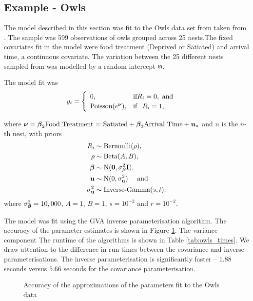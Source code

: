 \subsection{Example - Owls}
\label{sec:owls}

The model described in this section was fit to the Owls data set from taken
from \cite{zuur_mixed_2009}.  The sample was 599 observations of owls grouped
across 25 nests.The fixed covariates fit in the model were food treatment
(Deprived or Satiated) and arrival time, a continuous covariate.  The variation
between the 25 different nests sampled from was modelled by a random intercept
${\bf u}$.

The model fit was
$$
	y_i = \begin{cases}
	\begin{array}{ll}
	0, & \text{if} R_i = 0, \text{ and } \\
	\text{Poisson}(e^{\boldsymbol \nu}), & \text{if} \phantom{-} R_i = 1,
	\end{array}
	\end{cases}
$$

where ${\boldsymbol \nu} = {{\boldsymbol \beta}_2 \text{Food Treatment = Satiated} + {\boldsymbol \beta}_3
\text{Arrival Time} + {\bf u}_n}$ and $n$ is the $n$-th nest, with priors
\begin{align*}
R_i &\sim \text{Bernoulli}(\rho), \\
\rho &\sim \text{Beta}(A, B), \\
{\boldsymbol \beta} &\sim \text{N}({\bf 0}, \sigma_{\boldsymbol \beta}^2 {\bf I}), \\
{\bf u} &\sim \text{N}(0, \sigma_{\bf u}^2) \quad \text{ and } \\
\sigma_{\bf u}^2 &\sim \text{Inverse-Gamma}(s, t).
\end{align*}
where $\sigma_{\boldsymbol \beta}^2=10,000$, $A=1$, $B=1$, $s=10^{-2}$ and $r=10^{-2}$.

The model was fit using the GVA inverse parameterisation algorithm. The
accuracy of the parameter estimates is shown in Figure \ref{fig:owls}. The
variance component The runtime of the algorithms is shown in Table
\ref{tab:owls_times}. We draw attention to the difference in run-times between
the covariance and inverse parameterisations. The inverse parameterisation is
significantly faster -- $1.88$ seconds versus $5.66$ seconds for the covariance
parameterisation.

\begin{figure}[h]
	\centering
	\caption{Accuracy of the approximations of the parameters fit to the Owls data}
	\label{fig:owls}
\end{figure}

